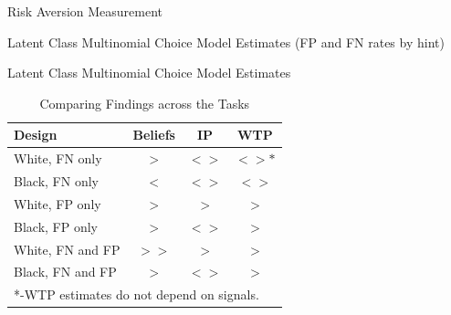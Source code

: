 \documentclass[11pt,a4paper]{article}
\begin{document}
\begin{table}[htbp!]
\caption{Risk Aversion Measurement}

\end{table}

%
\newpage
\footnotesize



\newpage

\begin{table}[H]
\caption{Latent Class Multinomial Choice Model Estimates (FP and FN rates by hint)}

\end{table}







\newpage
%

\begin{table}[H]
\caption{Latent Class Multinomial Choice Model Estimates}

\end{table}

%

%



%


%



\begin{table}[H]\centering
\caption{Comparing Findings across the Tasks}
\begin{tabular}{l|c|c|c}
\hline \hline
Design & Beliefs & IP &WTP\\
\hline
White, FN only & $>$ & $<>$ & $<>*$ \\
Black, FN only & $<$ & $<>$ & $<>$ \\
White, FP only & $>$ & $>$ & $>$ \\
Black, FP only & $>$ & $<>$ & $>$ \\
White, FN and FP & $>>$ & $>$ & $>$ \\
Black, FN and FP & $>$ & $<>$ & $>$\\
\hline
\multicolumn{4}{l}{*-WTP estimates do not depend on signals.}\\
\end{tabular}
\end{table}
\end{document}
